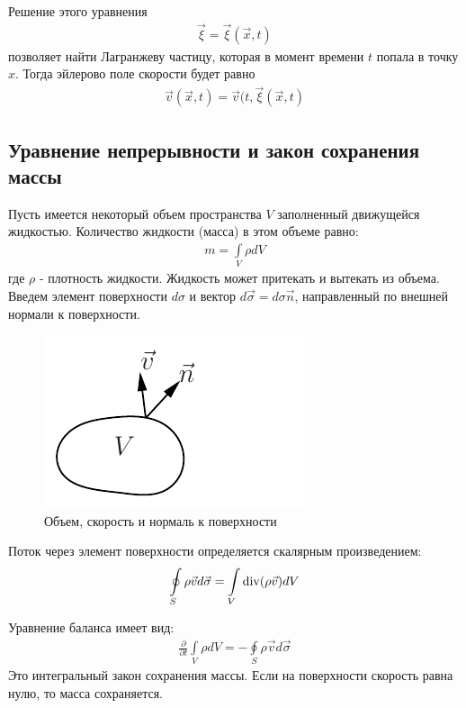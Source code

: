 Решение этого уравнения 
\begin{align*} 
\vec{\xi}=\vec{\xi}(\vec{x}, t)
\end{align*}
позволяет найти Лагранжеву частицу, которая в момент времени $t$ попала в точку $x$. Тогда эйлерово поле скорости будет равно
\begin{align*} 
\vec{v}(\vec{x}, t)=\vec{v}(t, \vec{\xi}(\vec{x}, t)
\end{align*}
\subsection{Уравнение непрерывности и закон сохранения массы}
Пусть имеется некоторый объем пространства $V$ заполненный движущейся  жидкостью. Количество жидкости (масса) в этом объеме равно:
\begin{align*} 
m=\int\limits_{V} \rho d V
\end{align*}
где $\rho$ - плотность жидкости. Жидкость может притекать и вытекать из объема. Введем элемент поверхности $ d \sigma $ и вектор $ d \vec{\sigma}=d \sigma \vec{n} $, направленный по внешней нормали к поверхности. 
\begin{figure}[h]
	\vspace{-10pt}
	\centering
	\includegraphics[scale=1]{photo/4.pdf}
	\caption{Объем, скорость и нормаль к поверхности}
	\label{fig:figure4}
\end{figure}
Поток через элемент поверхности определяется скалярным произведением:
\begin{align*}
\oint\limits_{S} \rho \vec{v} d \vec{\sigma}=\int\limits_{V} \operatorname{div}(\rho \vec{v}) d V
\end{align*}


Уравнение баланса имеет вид:
\begin{align*} 
\frac{\partial}{\partial t} \int\limits_{V} \rho d V=-\oint\limits_{S} \rho \vec{v} d \vec{\sigma}
\end{align*}
Это интегральный закон сохранения массы. Если на поверхности скорость равна нулю, то масса сохраняется.

